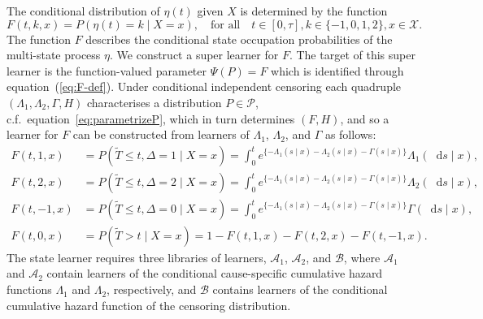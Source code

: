 \documentclass[numsec,webpdf,contemporary,medium,namedate]{oup-authoring-template}%
\theoremstyle{thmstyleone}%
\theoremstyle{thmstyletwo}%
\theoremstyle{thmstylethree}%
\newcommand*\diff{\mathop{}\!\mathrm{d}}
\newcommand{\midd}{\; \middle|\;}
\newcommand{\1}{\mathds{1}}
\begin{document}
The conditional
distribution of \( \eta(t) \) given \( X \) is determined by the function
\begin{equation}
  \label{eq:F-def}
  F(t, k, x) = P(\eta(t) = k \mid X=x),
  \quad \text{for all} \quad
  t \in [0,\tau],
  k \in \{-1,0,1,2\},
  x \in \mathcal{X}.
\end{equation}
The function \( F \) describes the conditional state occupation
probabilities of the multi-state process \(\eta\). We construct a
super learner for \( F \). The target of this super learner is the
function-valued parameter $\Psi(P) = F$ which is identified through
equation~(\ref{eq:F-def}).
Under conditional independent censoring each quadruple
$(\Lambda_{1}, \Lambda_{2}, \Gamma, H)$ characterises a distribution
\(P\in\mathcal P\), c.f.\ equation~\eqref{eq:parametrizeP}, which in turn
determines \( (F, H) \),
and so a learner for \( F \) can be constructed from learners of
\( \Lambda_1 \), \( \Lambda_2 \), and $\Gamma$ as follows:
\begin{equation}\label{eq:transition}
  \begin{split}
  F(t, 1, x)
  & = P(\tilde{T} \leq t, \Delta=1 \mid X=x)
    = \int_0^t e^{\{-\Lambda_{1}(s \mid x)-\Lambda_{2}(s \mid x) - \Gamma(s \mid x)\} }  \Lambda_{1}(\diff s \mid x),
  \\
  F(t, 2, x)
  & = P(\tilde{T} \leq t, \Delta=2 \mid X=x)
    = \int_0^t e^{\{-\Lambda_{1}(s \mid x)-\Lambda_{2}(s \mid x) - \Gamma(s \mid x)\} }  \Lambda_{2}(\diff s \mid x),
  \\
  F(t, -1, x)
  & =
    P(\tilde{T} \leq t, \Delta=0 \mid X=x)
    = \int_0^t e^{\{-\Lambda_{1}(s \mid x)-\Lambda_{2}(s \mid x) - \Gamma(s \mid x)\} }  \Gamma(\diff s \mid x),
  \\
  F(t, 0, x)
  &
    = P(\tilde{T} > t \mid X= x)
    = 1- F(t, 1, x) - F(t, 2, x)- F(t, -1, x).
  \end{split}
\end{equation}
The state learner requires three libraries of learners,
\(\mathcal{A}_1\), \( \mathcal{A}_2 \), and \( \mathcal{B} \), where
\(\mathcal{A}_1\) and \( \mathcal{A}_2\) contain learners of the
conditional cause-specific cumulative hazard functions \(\Lambda_1\)
and \( \Lambda_2\), respectively, and \(\mathcal{B}\) contains
learners of the conditional cumulative hazard function of the
censoring distribution. %
\end{document}
